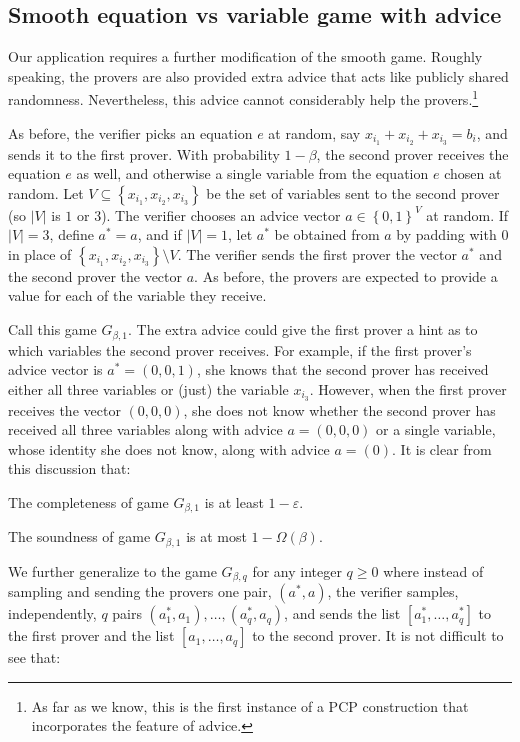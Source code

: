 \documentclass{toc}
\newcommand\set[1]{{\left\{ #1 \right\}}}
\newcommand\power[1]{\set{0,1}^{#1}}
\newcommand\eps{\varepsilon}
\renewcommand\geq{\geqslant}
\begin{document}
\subsection{Smooth equation vs variable game with advice}


Our application requires a further modification of the smooth game.
Roughly speaking,
the provers are also provided extra advice that acts like publicly shared randomness.
Nevertheless, this advice cannot considerably help the provers.\footnote{As far as we know, this is the first
instance of a PCP construction that incorporates the feature of advice.}

As before, the verifier picks an equation $e$ at random, say $x_{i_1} + x_{i_2} + x_{i_3} = b_{i}$,
and sends it to the first prover. With probability $1-\beta$, the second prover receives the
equation $e$ as well, and otherwise a single variable from the equation $e$ chosen at random.
Let $V\subseteq \set{x_{i_1},x_{i_2},x_{i_3}}$ be the set of variables sent to the second prover (so
$|V|$ is $1$ or $3$).
The verifier chooses an advice vector $a \in\power{V}$ at random. If $|V|=3$, define $a^* = a$, and
if $|V|=1$, let $a^*$ be obtained from $a$ by padding with $0$ in place of $\set{x_{i_1},x_{i_2},x_{i_3}}\setminus V$.
The verifier sends the first prover the vector $a^*$ and the second prover the vector $a$. As before, the
provers are expected to provide a value for each of the variable they receive.


Call this game $G_{\beta, 1}$. The extra advice could give the first prover a hint as to which variables the second prover receives.
For example, if the first prover's advice vector is $a^* = (0,0,1)$, she knows that the second prover has received
either all three variables or (just) the variable $x_{i_3}$.
However, when the first prover receives the vector $(0,0,0)$, she does not know whether the second prover has received
all three variables along with advice $a = (0,0,0)$ or a single variable, whose identity she does not know,
along with advice $a = (0)$. It is clear from this discussion that:

\smallskip
{} The completeness of game $G_{\beta, 1}$ is at least $1-\eps$.

\smallskip
{} The soundness of game $G_{\beta, 1}$ is at most $1- \Omega\left(\beta\right)$.

\smallskip
We further generalize to the game $G_{\beta, q}$ for any integer $q \geq 0$
where instead of sampling and sending the provers one pair,
%
%
$(a^*, a)$,
%
%
the verifier samples, %
independently, $q$ pairs $(a_1^*, a_1), \ldots, (a_q^*, a_q)$, and sends the list $[a_1^*, \ldots, a_q^* ]$ to the first prover and
the list $[a_1, \ldots, a_q]$ to the second prover. It is not difficult to see that:
\end{document}
